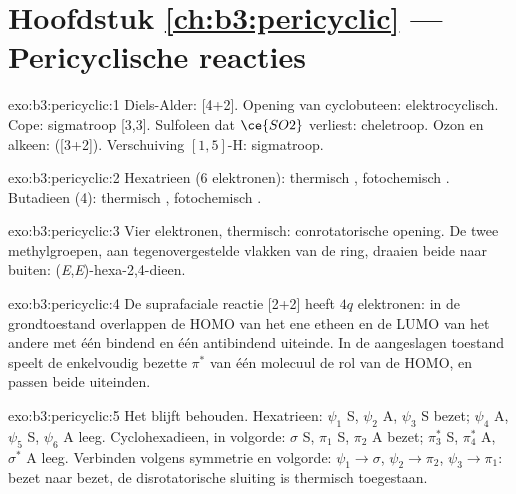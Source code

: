 \section*{Hoofdstuk \ref{ch:b3:pericyclic} --- Pericyclische reacties}

\begin{solution}{exo:b3:pericyclic:1}
Diels-Alder:  [4+2]. Opening van cyclobuteen: elektrocyclisch.
Cope: sigmatroop [3,3]. Sulfoleen dat $\ce{SO2}$ verliest: cheletroop. Ozon en
alkeen: 
([3+2]). Verschuiving $[1,5]$-H: sigmatroop.
\end{solution}

\begin{solution}{exo:b3:pericyclic:2}
Hexatrieen (6 elektronen): thermisch , fotochemisch
. Butadieen (4): thermisch , fotochemisch
.
\end{solution}

\begin{solution}{exo:b3:pericyclic:3}
Vier elektronen, thermisch: conrotatorische opening. De twee
methylgroepen, aan tegenovergestelde vlakken van de ring, draaien beide
naar buiten: (\textit{E},\textit{E})-hexa-2,4-dieen.
\end{solution}

\begin{solution}{exo:b3:pericyclic:4}
De suprafaciale reactie [2+2] heeft $4q$ elektronen: in de grondtoestand overlappen de HOMO van het ene
etheen en de LUMO van het andere met één bindend en één antibindend
uiteinde. In de aangeslagen toestand speelt de enkelvoudig bezette $\pi^*$ van één molecuul de rol van de
HOMO, en passen beide uiteinden.
\end{solution}

\begin{solution}{exo:b3:pericyclic:5}
Het  blijft behouden. Hexatrieen: $\psi_1$ S, $\psi_2$ A, $\psi_3$ S bezet; $\psi_4$ A, $\psi_5$ S, $\psi_6$ A leeg.
Cyclohexadieen, in volgorde: $\sigma$ S, $\pi_1$ S, $\pi_2$ A bezet; $\pi_3^*$ S, $\pi_4^*$ A, $\sigma^*$ A leeg. Verbinden volgens
symmetrie en volgorde: $\psi_1 \to \sigma$, $\psi_2 \to \pi_2$, $\psi_3 \to \pi_1$: bezet naar bezet, de disrotatorische sluiting
is thermisch toegestaan.
\end{solution}

